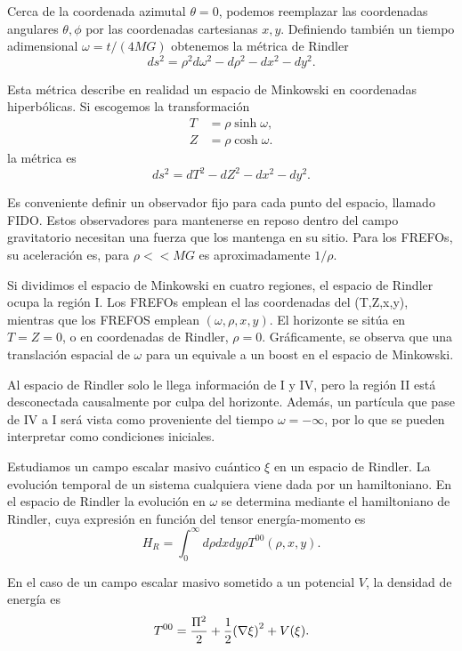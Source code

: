 Cerca de la coordenada azimutal $\theta=0$, podemos reemplazar las coordenadas
angulares $\theta,\phi$ por las coordenadas cartesianas $x,y$. Definiendo
también un tiempo adimensional $\omega=t/(4MG)$ obtenemos la métrica de Rindler
\begin{equation}
  ds^2=\rho^2d\omega^2 -d\rho^2 -dx^2-dy^2.
\end{equation}

Esta métrica describe en realidad un espacio de Minkowski en coordenadas hiperbólicas.
Si escogemos la transformación
\begin{align}
  T&=\rho \sinh \omega, \\
  Z&=\rho \cosh \omega.
\end{align}
la métrica es
\begin{equation}
  ds^2=dT^2-dZ^2-dx^2-dy^2.
\end{equation}

Es conveniente definir un observador fijo para cada punto del espacio, llamado
FIDO. Estos observadores para mantenerse
en reposo dentro del campo gravitatorio necesitan una fuerza que los mantenga
en su sitio. Para los FREFOs, su aceleración es, para $\rho<<MG$ es aproximadamente $1/\rho$.

Si dividimos el espacio de Minkowski en cuatro regiones, el espacio de Rindler ocupa
la región I. Los FREFOs emplean el las coordenadas del (T,Z,x,y), mientras que
los FREFOS emplean $(\omega, \rho, x, y)$. El horizonte se sitúa en $T=Z=0$, o
en coordenadas de Rindler, $\rho=0$.
Gráficamente, se observa que una translación espacial de $\omega$ para un equivale
a un boost en el espacio de Minkowski.

Al espacio de Rindler solo le llega información de I y IV, pero la región II está 
desconectada causalmente por culpa del horizonte.
Además, un partícula que pase de IV a I será vista como proveniente del tiempo 
$\omega=-\infty$, por lo que se pueden interpretar como condiciones iniciales.

Estudiamos un campo escalar masivo cuántico $\xi$ en un espacio de Rindler.
La evolución temporal de un sistema cualquiera viene dada por un hamiltoniano. En el
espacio de Rindler la evolución en $\omega$ se determina mediante el hamiltoniano de
Rindler, cuya expresión en función del tensor energía-momento es
\begin{equation}
  H_R=\int_0^\infty d\rho dxdy \rho T^{00} (\rho, x, y).
\end{equation}

En el caso de un campo escalar masivo sometido a un potencial $V$, la densidad de energía
es
\begin{equation}
  T^{00}=\frac{\Pi^2}{2}+\frac{1}{2}\qty(\nabla \xi)^2+V(\xi).
\end{equation}

